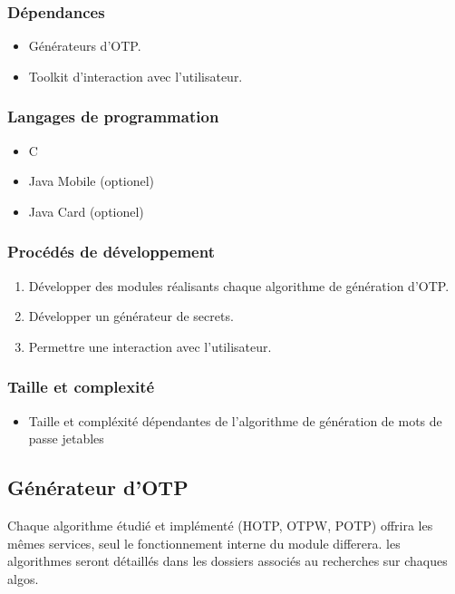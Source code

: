 \documentclass{"../../res/univ-projet"}
\begin{document}
    \subsubsection{Dépendances}
        \begin{itemize}
            \item Générateurs d'OTP.
            \item Toolkit d'interaction avec l'utilisateur.
        \end{itemize}

    \subsubsection{Langages de programmation}
    \begin{itemize}
        \item C
        \item Java Mobile (optionel)
        \item Java Card (optionel)
    \end{itemize}

    \subsubsection{Procédés de développement}
    \begin{enumerate}
        \item Développer des modules réalisants chaque algorithme de génération
            d'OTP.
        \item Développer un générateur de secrets.
        \item Permettre une interaction avec l'utilisateur.
    \end{enumerate}

    \subsubsection{Taille et complexité}
    \begin{itemize}
        \item Taille et compléxité dépendantes de l'algorithme de génération
            de mots de passe jetables
    \end{itemize}

\subsection{Générateur d'OTP}
    Chaque algorithme \'etudi\'e et impl\'ement\'e (HOTP, OTPW, POTP) offrira les
    mêmes services, seul le fonctionnement interne du module differera.
    les algorithmes seront détaillés dans les dossiers associés au recherches sur 
    chaques algos.
\end{document}

